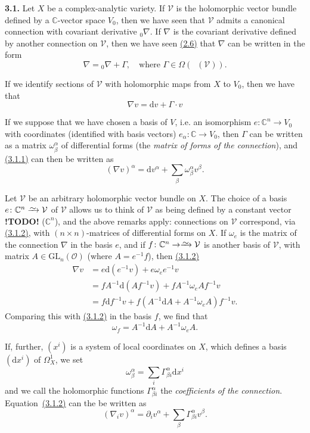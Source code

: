 \documentclass{report}
\newenvironment{rmenv}[1]
  {\phantomsection\par\medskip\noindent\textbf{#1.}\rmfamily}
  {\medskip}
\renewcommand{\cal}[1]{{\mathcal{#1}}}
\newcommand{\CC}{\mathbb{C}}
\newcommand{\dd}{\mathrm{d}}
\newcommand{\GL}{\mathrm{GL}}
\newcommand{\simto}{\xrightarrow{\raisebox{-0.7ex}[0ex][0ex]{$\sim$}}}
\DeclareMathOperator{\shEnd}{\underline{End}}
\newcommand{\todo}{\textbf{ !TODO! }}
\newcommand{\oldpage}[1]{\marginpar{\footnotesize$\Big\vert$ \textit{p.~#1}}}
\begin{document}
\begin{rmenv}{3.1}
\label{I.3.1}
  Let $X$ be a complex-analytic variety.
  If $\cal{V}$ is the holomorphic vector bundle defined by a $\CC$-vector space $V_0$, then we have seen that $\cal{V}$ admits a canonical connection with covariant derivative ${}_0\!\nabla$.
  If $\nabla$ is the covariant derivative defined by another connection on $\cal{V}$, then we have seen \hyperref[I.2.6]{(2.6)} that $\nabla$ can be written in the form
  \[
    \nabla = {}_0\!\nabla + \Gamma,
    \quad\mbox{where $\Gamma\in\Omega(\shEnd(\cal{V}))$.}
  \]

  If we identify sections of $\cal{V}$ with holomorphic maps from $X$ to $V_0$, then we have that
  \[
  \label{I.3.1.1}
    \nabla v = \dd v + \Gamma\cdot v
  \tag{3.1.1}
  \]

  If we suppose that we have chosen a basis of $V$, i.e. an isomorphism $e\colon\CC^n\to V_0$ with coordinates (identified with basis vectors) $e_\alpha\colon\CC\to V_0$, then $\Gamma$ can be written as a matrix $\omega_\beta^\alpha$ of differential forms (the \emph{matrix of forms of the connection}), and \hyperref[I.3.1.1]{(3.1.1)} can then be written as
  \[
  \label{I.3.1.2}
    (\nabla v)^\alpha = \dd v^\alpha + \sum_\beta \omega_\beta^\alpha v^\beta.
  \tag{3.1.2}
  \]

  Let $\cal{V}$ be an arbitrary holomorphic vector bundle on $X$.
  The choice of a basis $e\colon\CC^n\simto\cal{V}$ of $\cal{V}$ allows us to think of $\cal{V}$ as being defined by a
\oldpage{22}
  constant vector \todo ($\CC^n$), and the above remarks apply:
  connections on $\cal{V}$ correspond, via \hyperref[I.3.1.2]{(3.1.2)}, with $(n\times n)$-matrices of differential forms on $X$.
  If $\omega_e$ is the matrix of the connection $\nabla$ in the basis $e$, and if $f\colon\CC^n\to\simto\cal{V}$ is another basis of $\cal{V}$, with matrix $A\in\GL_n(\cal{O})$ (where $A=e^{-1}f$), then \hyperref[I.3.1.2]{(3.1.2)}
  \[
    \begin{aligned}
      \nabla v
      &= e\dd(e^{-1}v) + e\omega_e e^{-1}v
    \\&= fA^{-1}\dd(Af^{-1}v) + fA^{-1}\omega_e Af^{-1}v
    \\&= f\dd f^{-1}v + f(A^{-1}\dd A + A^{-1}\omega_e A)f^{-1}v.
    \end{aligned}
  \]
  Comparing this with \hyperref[I.3.1.2]{(3.1.2)} in the basis $f$, we find that
  \[
  \label{I.3.1.3}
    \omega_f = A^{-1}\dd A + A^{-1}\omega_e A.
  \tag{3.1.3}
  \]

  If, further, $(x^i)$ is a system of local coordinates on $X$, which defines a basis $(\dd x^i)$ of $\Omega_X^1$, we set
  \[
    \omega_\beta^\alpha = \sum_i \Gamma_{\beta i}^\alpha \dd x^i
  \]
  and we call the holomorphic functions $\Gamma_{\beta i}^\alpha$ the \emph{coefficients of the connection}.
  Equation~\hyperref[I.3.1.2]{(3.1.2)} can the be written as
  \[
  \label{I.3.1.4}
    (\nabla_i v)^\alpha = \partial_i v^\alpha + \sum_\beta \Gamma_{\beta i}^\alpha v^\beta.
  \tag{3.1.4}
  \]


\end{rmenv}
\end{document}
